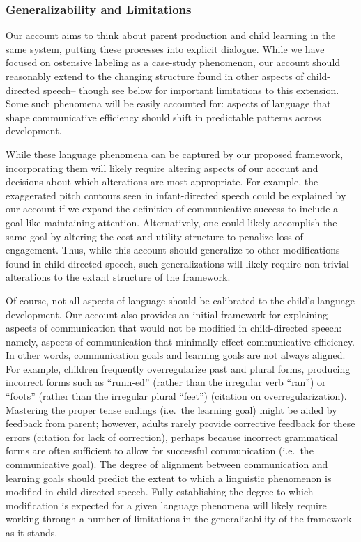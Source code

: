 \documentclass[english,,man,floatsintext]{apa6}
\begin{document}
\hypertarget{generalizability-and-limitations}{%
\subsubsection{Generalizability and Limitations}\label{generalizability-and-limitations}}

Our account aims to think about parent production and child learning in the same system, putting these processes into explicit dialogue. While we have focused on ostensive labeling as a case-study phenomenon, our account should reasonably extend to the changing structure found in other aspects of child-directed speech-- though see below for important limitations to this extension. Some such phenomena will be easily accounted for: aspects of language that shape communicative efficiency should shift in predictable patterns across development.

While these language phenomena can be captured by our proposed framework, incorporating them will likely require altering aspects of our account and decisions about which alterations are most appropriate. For example, the exaggerated pitch contours seen in infant-directed speech could be explained by our account if we expand the definition of communicative success to include a goal like maintaining attention. Alternatively, one could likely accomplish the same goal by altering the cost and utility structure to penalize loss of engagement. Thus, while this account should generalize to other modifications found in child-directed speech, such generalizations will likely require non-trivial alterations to the extant structure of the framework.

Of course, not all aspects of language should be calibrated to the child's language development. Our account also provides an initial framework for explaining aspects of communication that would not be modified in child-directed speech: namely, aspects of communication that minimally effect communicative efficiency. In other words, communication goals and learning goals are not always aligned. For example, children frequently overregularize past and plural forms, producing incorrect forms such as \enquote{runn-ed} (rather than the irregular verb \enquote{ran}) or \enquote{foots} (rather than the irregular plural \enquote{feet}) (citation on overregularization). Mastering the proper tense endings (i.e.~the learning goal) might be aided by feedback from parent; however, adults rarely provide corrective feedback for these errors (citation for lack of correction), perhaps because incorrect grammatical forms are often sufficient to allow for successful communication (i.e.~the communicative goal). The degree of alignment between communication and learning goals should predict the extent to which a linguistic phenomenon is modified in child-directed speech. Fully establishing the degree to which modification is expected for a given language phenomena will likely require working through a number of limitations in the generalizability of the framework as it stands.
\end{document}
